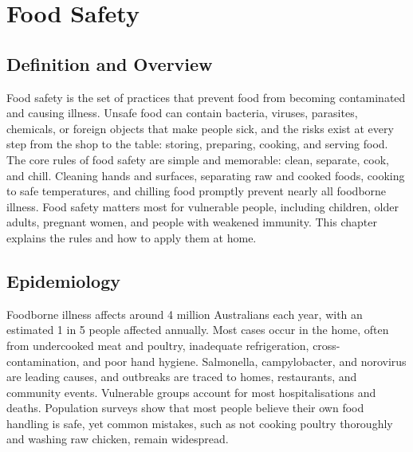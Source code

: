 \chapter{Food Safety}

\section*{Definition and Overview}
Food safety is the set of practices that prevent food from becoming contaminated and causing illness. Unsafe food can contain bacteria, viruses, parasites, chemicals, or foreign objects that make people sick, and the risks exist at every step from the shop to the table: storing, preparing, cooking, and serving food. The core rules of food safety are simple and memorable: clean, separate, cook, and chill. Cleaning hands and surfaces, separating raw and cooked foods, cooking to safe temperatures, and chilling food promptly prevent nearly all foodborne illness. Food safety matters most for vulnerable people, including children, older adults, pregnant women, and people with weakened immunity. This chapter explains the rules and how to apply them at home.

\section*{Epidemiology}
Foodborne illness affects around 4 million Australians each year, with an estimated 1 in 5 people affected annually. Most cases occur in the home, often from undercooked meat and poultry, inadequate refrigeration, cross-contamination, and poor hand hygiene. Salmonella, campylobacter, and norovirus are leading causes, and outbreaks are traced to homes, restaurants, and community events. Vulnerable groups account for most hospitalisations and deaths. Population surveys show that most people believe their own food handling is safe, yet common mistakes, such as not cooking poultry thoroughly and washing raw chicken, remain widespread.

